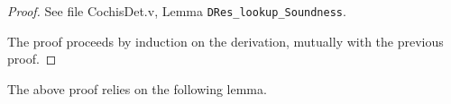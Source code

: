 {\centering
{}}
\begin{proof}
See file CochisDet.v, Lemma \texttt{DRes\_lookup\_Soundness}.

The proof proceeds by induction on the derivation, mutually 
with the previous proof.
\end{proof}
The above proof relies on the following lemma.

